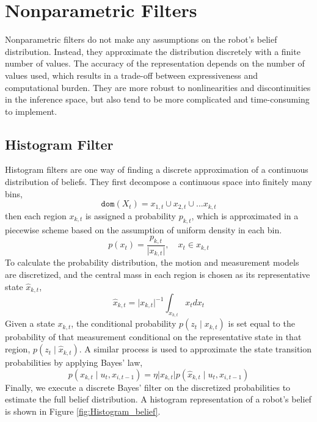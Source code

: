 \documentclass[twoside]{article}
\begin{document}
\section{Nonparametric Filters}
Nonparametric filters do not make any assumptions on the robot's belief distribution. Instead, they approximate the distribution discretely with a finite number of values. The accuracy of the representation depends on the number of values used, which results in a trade-off between expressiveness and computational burden. They are more robust to nonlinearities and discontinuities in the inference space, but also tend to be more complicated and time-consuming to implement.

\subsection{Histogram Filter}

Histogram filters are one way of finding a discrete approximation of a continuous distribution of beliefs. They first decompose a continuous space into finitely many bins,
\begin{equation}
\mathtt{dom}(X_t) = x_{1,t} \cup x_{2,t} \cup ... x_{k,t}
\end{equation}
then each region $x_{k,t}$ is assigned a probability $p_{k,t}$, which is approximated in a piecewise scheme based on the assumption of uniform density in each bin.
\begin{equation}
p(x_t) = \frac{p_{k,t}}{\lvert x_{k,t} \rvert},\quad x_t \in x_{k,t}
\end{equation}
To calculate the probability distribution, the motion and measurement models are discretized, and the central mass in each region is chosen as its representative state $\hat x_{k,t}$,
\begin{equation}
\hat x_{k,t} = \lvert x_{k,t} \rvert ^{-1}\int_{x_{k,t}}x_t d x_t
\end{equation}
Given a state $x_{k,t}$, the conditional probability $p(z_t \mid x_{k,t})$ is set equal to the probability of that measurement conditional on the representative state in that region, $p(z_t \mid \hat x_{k,t})$. A similar process is used to approximate the state transition probabilities by applying Bayes' law,
\begin{equation}
p(x_{k,t} \mid u_t, x_{i,t-1}) = \eta \lvert x_{k,t} \rvert p(\hat x_{k,t} \mid u_t, \hat x_{i,t-1})
\end{equation}
Finally, we execute a discrete Bayes' filter on the discretized probabilities to estimate the full belief distribution. A histogram representation of a robot's belief is shown in Figure \ref{fig:Histogram_belief}.
\end{document}
